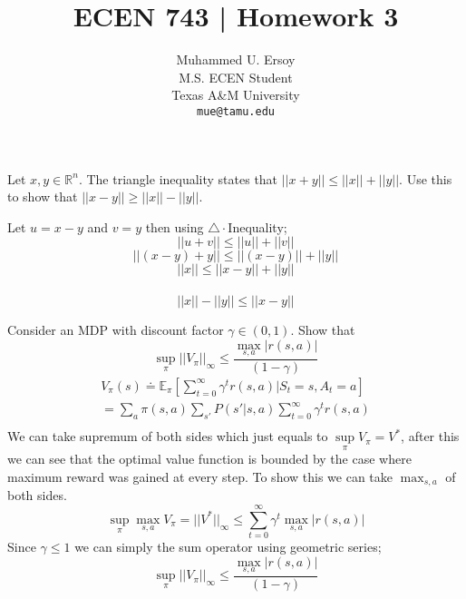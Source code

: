 \documentclass{article}
\title{ECEN 743 | Homework 3}
\author{%
  Muhammed U. Ersoy\\
  M.S. ECEN Student\\
  Texas A\&M University\\
  \texttt{mue@tamu.edu} \\
 }
\begin{document}
\maketitle

\begin{tcolorbox}[colback=blue!5!white,colframe=blue!75!black,title=Question 1]
    Let $x,y \in \mathbb{R}^n$. The triangle inequality states that $||x+y|| \leq ||x|| + ||y||$. Use this to
    show that $ ||x - y|| \geq ||x|| - ||y||$.
    \tcblower
    \begin{aligned*}
    \centering
    Let $u = x - y$ and $v = y$ then using $\triangle\cdot$Inequality;\\
    $$ ||u + v|| \leq ||u|| + ||v||$$ 
    $$ ||(x-y) + y|| \leq ||(x-y)|| + ||y||$$
    $$ || x || \leq ||x-y|| + ||y||$$\\
    $$ ||x|| - ||y|| \leq ||x-y||$$
    \end{aligned*}
\end{tcolorbox}

\begin{tcolorbox}[colback=blue!5!white,colframe=blue!75!black,title=Question 2]
Consider an MDP with discount factor $\gamma \in (0,1)$. Show
that
\begin{equation}
        \sup\limits_{\pi}||V_\pi||_{\infty} \leq \frac{\max_{s,a} |r(s,a)|}{(1 - \gamma)}
\end{equation}
\tcblower
\begin{equation}
    \begin{split}
    V_{\pi}(s) \doteq \mathbb{E}_{\pi}[ \sum\limits_{t=0}^{\infty} \gamma^t r(s,a) | S_t = s, A_t = a] \\
    = \sum\limits_{a} \pi(s,a) \sum\limits_{s'} P(s' | s, a) \sum\limits_{t=0}^{\infty} \gamma^t r(s,a)\\ 
\end{split}
\end{equation}
We can take supremum of both sides which just equals to $\sup\limits_\pi V_\pi = V^*$, after this we can see that
the optimal value function is bounded by the case where maximum reward was gained at every step. To show this we can
take $\max_{s,a}$ of both sides.
\begin{equation}
    \sup\limits_\pi \max_{s,a} V_\pi = || V^* ||_{\infty} \leq \sum\limits_{t=0}^\infty \gamma^t \max_{s,a} | r(s,a) |
\end{equation}
Since $\gamma \leq 1$ we can simply the sum operator using geometric series;
\begin{equation}
    \sup\limits_\pi ||V_\pi||_\infty \leq \frac{\max_{s,a}|r(s,a)|}{(1 - \gamma)} 
\end{equation}
\end{tcolorbox}
\end{document}
